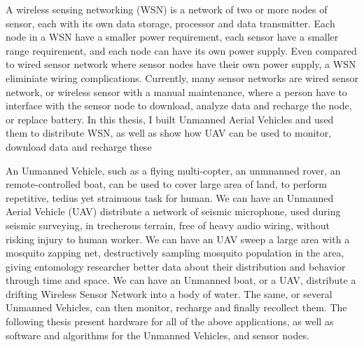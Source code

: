 

A wireless sensing networking (WSN) is a network of two or more nodes of sensor, each with its own data storage, processor and data transmitter.
Each node in a WSN have a smaller power requirement, each sensor have a smaller range requirement, and each node can have its own power supply.
Even compared to wired sensor network where sensor nodes have their own power supply, a WSN eliminiate wiring complications.
Currently, many sensor networks are wired sensor network, or wireless sensor with a manual maintenance, where a person have to interface with the sensor node to download, analyze data and recharge the node, or replace battery.
In this thesis, I built Unmanned Aerial Vehicles and used them to distribute WSN, as well as show how UAV can be used to monitor, download data and recharge these 


An Unmanned Vehicle, such as a flying multi-copter, an unmnanned rover, an remote-controlled boat, can be used to cover large area of land, to perform repetitive, tedius yet strainuous task for human.
We can have an Unmanned Aerial Vehicle (UAV) distribute a network of seismic microphone, used during seismic surveying, in trecherous terrain, free of heavy audio wiring, without risking injury to human worker.
We can have an UAV sweep a large area with a mosquito zapping net, destructively sampling mosquito population in the area, giving entomology researcher better data about their distribution and behavior through time and space.
We can have an Unmanned boat, or a UAV, distribute a drifting Wireless Sensor Network into a body of water.
The same, or several Unmanned Vehicles, can then monitor, recharge and finally recollect them.
The following thesis present hardware for all of the above applications, as well as software and algorithms for the Unmanned Vehicles, and sensor nodes.
